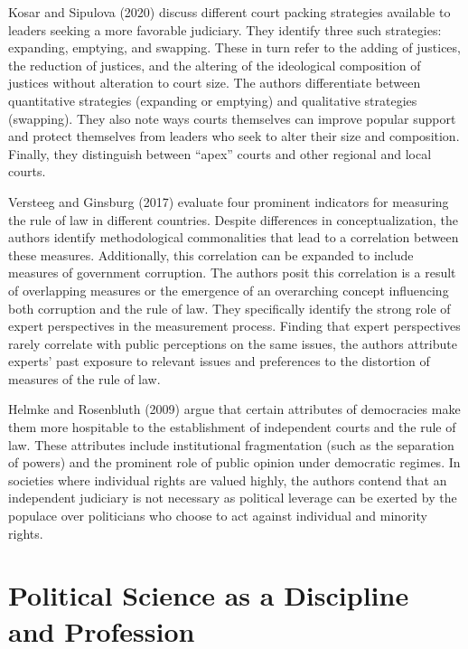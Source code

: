 \documentclass[
  english,
  man]{apa6}
\begin{document}
Kosar and Sipulova (2020) discuss different court packing strategies available to leaders seeking a more favorable judiciary. They identify three such strategies: expanding, emptying, and swapping. These in turn refer to the adding of justices, the reduction of justices, and the altering of the ideological composition of justices without alteration to court size. The authors differentiate between quantitative strategies (expanding or emptying) and qualitative strategies (swapping). They also note ways courts themselves can improve popular support and protect themselves from leaders who seek to alter their size and composition. Finally, they distinguish between \enquote{apex} courts and other regional and local courts.

Versteeg and Ginsburg (2017) evaluate four prominent indicators for measuring the rule of law in different countries. Despite differences in conceptualization, the authors identify methodological commonalities that lead to a correlation between these measures. Additionally, this correlation can be expanded to include measures of government corruption. The authors posit this correlation is a result of overlapping measures or the emergence of an overarching concept influencing both corruption and the rule of law. They specifically identify the strong role of expert perspectives in the measurement process. Finding that expert perspectives rarely correlate with public perceptions on the same issues, the authors attribute experts' past exposure to relevant issues and preferences to the distortion of measures of the rule of law.

Helmke and Rosenbluth (2009) argue that certain attributes of democracies make them more hospitable to the establishment of independent courts and the rule of law. These attributes include institutional fragmentation (such as the separation of powers) and the prominent role of public opinion under democratic regimes. In societies where individual rights are valued highly, the authors contend that an independent judiciary is not necessary as political leverage can be exerted by the populace over politicians who choose to act against individual and minority rights.

\hypertarget{political-science-as-a-discipline-and-profession}{%
\section{Political Science as a Discipline and Profession}\label{political-science-as-a-discipline-and-profession}}
\end{document}
